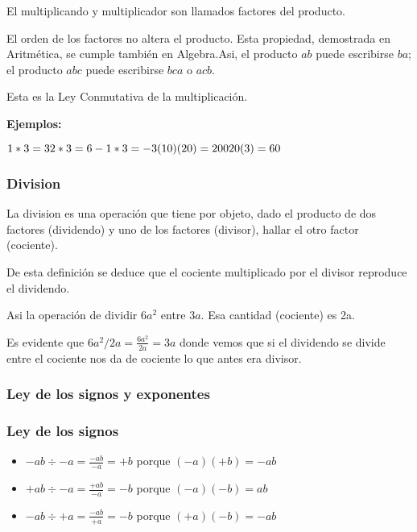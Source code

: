 El multiplicando y multiplicador son llamados factores del producto.

El orden de los factores no altera el producto. Esta propiedad, demostrada en Aritmética, se cumple también en Algebra.Asi, el producto $ab$ puede escribirse $ba$; el producto $abc$ puede escribirse $bca$ o $acb$.

Esta es la Ley Conmutativa de la multiplicación.

\textbf{Ejemplos:}

$
	1 * 3 = 3\\
	2 * 3 = 6\\
	-1 * 3 = -3\\
	(10)(20) = 200\\
	20(3) = 60\\
$

\subsubsection*{Division}

La division es una operación que tiene por objeto, dado el producto de dos factores (dividendo) y uno de los factores (divisor), hallar el otro factor (cociente).

De esta definición se deduce que el cociente multiplicado por el divisor reproduce el dividendo.

Asi la operación de dividir $6a^2$ entre $3a$. Esa cantidad (cociente) es 2a.

Es evidente que $6a^2 / 2a = \frac{6a^2}{2a} = 3a$ donde  vemos que si el dividendo se divide entre el cociente nos da de cociente lo que antes era divisor.

\subsubsection{Ley de los signos y exponentes}

\subsubsection*{Ley de los signos}

\begin{itemize}
	\item $-ab \div -a = \frac{-ab}{-a} = +b$ porque $(-a)(+b) = -ab$
	\item $+ab \div -a = \frac{+ab}{-a} = -b$ porque $(-a)(-b) = ab$
	\item $-ab \div +a = \frac{-ab}{+a} = -b$ porque $(+a)(-b) = -ab$
\end{itemize}

